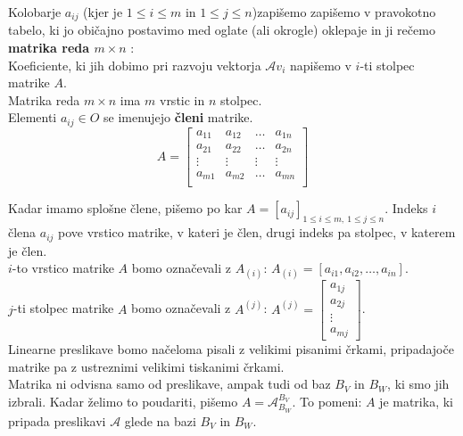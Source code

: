 \documentclass[a4paper,12pt]{article}
\newcommand{\A}{\mathcal{A}}
\begin{document}
Kolobarje $a_{ij}$ (kjer je $1 \leq i \leq m$ in $1 \leq j \leq n$)zapišemo zapišemo v pravokotno tabelo, ki jo običajno postavimo med oglate (ali okrogle) oklepaje in ji rečemo \textbf{matrika reda $m\times n$ }:\\

Koeficiente, ki jih dobimo pri razvoju vektorja $\A v_i$ napišemo v $i$-ti stolpec matrike $A$. \\

Matrika reda $m\times n$ ima $m$ vrstic in $n$ stolpec. \\

Elementi $a_{ij}\in O$ se imenujejo \textbf{členi} matrike. \\

$$A=
\begin{bmatrix}
	a_{11} & a_{12} & \ldots & a_{1n} \\
	a_{21} & a_{22} & \ldots & a_{2n} \\
	\vdots & \vdots & \vdots & \vdots \\
	a_{m1} & a_{m2} & \ldots & a_{mn} \\
\end{bmatrix}
$$

\newpage 

Kadar imamo splošne člene, pišemo po kar $A=[a_{ij}]_{1 \leq i \leq m,~ 1\leq j \leq n}$. Indeks $i$ člena $a_{ij}$ pove vrstico matrike, v kateri je člen, drugi indeks pa stolpec, v katerem je člen. \\

$i$-to vrstico matrike $A$ bomo označevali z $A_{(i)}$: $A_{(i)}=[a_{i1},a_{i2},\ldots,a_{in}]$.\\

$j$-ti stolpec matrike $A$ bomo označevali z $A^{(j)}$: $A^{(j)}=\begin{bmatrix} a_{1j} \\ a_{2j} \\ \vdots \\ a_{mj} \end{bmatrix}$.\\
	
Linearne preslikave bomo načeloma pisali z velikimi pisanimi črkami, pripadajoče matrike pa z ustreznimi velikimi tiskanimi črkami. \\

Matrika ni odvisna samo od preslikave, ampak tudi od baz $B_V$ in $B_W$, ki smo jih izbrali. Kadar želimo to poudariti, pišemo $A=\mathcal{A}_{B_W}^{B_V}$. To pomeni: $A$ je matrika, ki pripada preslikavi $\mathcal{A}$ glede na bazi $B_V$ in $B_W$. \\
\end{document}
